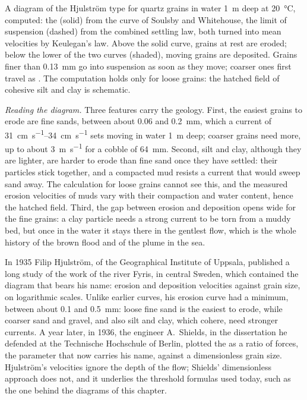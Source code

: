 \begin{omfigure}
{\small A diagram of the Hjulström type for quartz grains in water
\qty{1}{m} deep at \qty{20}{\celsius}, computed: the  (solid)
from the curve of Soulsby and Whitehouse, the limit of suspension (dashed) from
the combined settling law, both turned into mean velocities by Keulegan's law. Above the solid curve, grains
at rest are eroded; below the lower of the two curves (shaded), moving grains
are deposited. Grains finer than \qty{0.13}{mm} go into suspension as soon as
they move; coarser ones first travel as . The computation holds only
for loose grains: the hatched field of cohesive silt and clay is schematic.}
\label{fig:b1:erosion-transport:hjulstrom}
\end{omfigure}

\emph{Reading the diagram.} Three features carry the geology. First, the
easiest grains to erode are fine sands, between about \num{0.06} and
\qty{0.2}{mm}, which a current of \qtyrange{31}{34}{cm.s^{-1}} sets moving in
water \qty{1}{m} deep; coarser grains need more, up to about
\qty{3}{m.s^{-1}} for a cobble of \qty{64}{mm}. Second, silt and clay, although
they are lighter, are harder to erode than fine sand once they have settled:
their particles stick together, and a compacted mud resists a current that
would sweep sand away. The calculation for loose grains cannot see this, and
the measured erosion velocities of muds vary with their compaction and water
content, hence the hatched field. Third, the gap between erosion and
deposition opens wide for the fine grains: a clay particle needs a strong
current to be torn from a muddy bed, but once in the water it stays there in
the gentlest flow, which is the whole history of the brown flood and of the
plume in the sea.

\begin{history}
In 1935 Filip Hjulström, of the Geographical Institute of Uppsala, published a
long study of the work of the river Fyris, in central Sweden, which contained
the diagram that bears his name: erosion and deposition velocities against
grain size, on logarithmic scales. Unlike earlier curves, his erosion curve had
a minimum, between about \num{0.1} and \qty{0.5}{mm}: loose fine sand is the
easiest to erode, while coarser sand and gravel, and also silt and clay, which
cohere, need stronger currents. A year later, in 1936, the engineer A.~Shields,
in the dissertation he defended at the Technische Hochschule of Berlin, plotted
the  as a ratio of forces, the parameter that now carries
his name, against a dimensionless grain size. Hjulström's velocities ignore the
depth of the flow; Shields' dimensionless approach does not, and it underlies
the threshold formulas used today, such as the one behind the diagrams of this
chapter.
\end{history}

